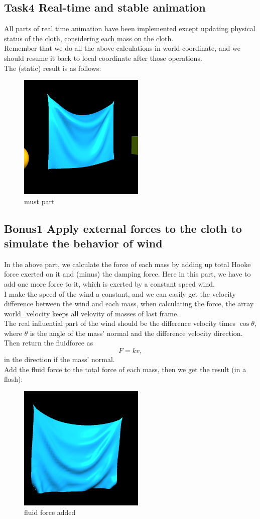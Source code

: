 \documentclass[acmtog]{acmart}
\begin{document}
\subsection{Task4 Real-time and stable animation}
All parts of real time animation have been implemented except updating physical status of the cloth, considering each mass on the cloth.\\
Remember that we do all the above calculations in world coordinate, and we should resume it back to local coordinate after those operations.\\
The (static) result is as follows:
\begin{figure}[h]
	\includegraphics[width=6cm,height=6cm]{must.png}
	\caption{must part}
\end{figure}

\subsection{Bonus1 Apply external forces to the cloth to simulate the behavior of wind}
In the above part, we calculate the force of each mass by adding up total Hooke force exerted on it and (minus) the damping force. Here in this part, we have to add one more force to it, which is exerted by a constant speed wind.\\
I make the speed of the wind a constant, and we can easily get the velocity difference between the wind and each mass, when calculating the force, the array world\_velocity keeps all velovity of masses of last frame.\\
The real influential part of the wind should be the difference velocity times $\cos{\theta}$, where $\theta$ is the angle of the mass' normal and the difference velocity direction. Then return the fluidforce as $$F=kv,$$ in the direction if the mass' normal.\\
Add the fluid force to the total force of each mass, then we get the result (in a flash):
\begin{figure}[h]
	\includegraphics[width=6cm,height=6cm]{wind1.png}
	\caption{fluid force added}
\end{figure}
\end{document}
